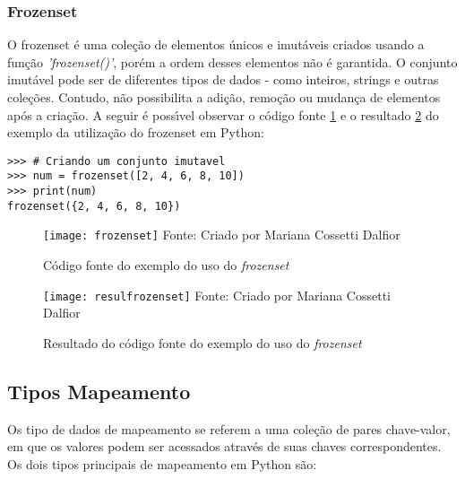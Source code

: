 \subsubsection{Frozenset}
O frozenset \'{e} uma cole\c{c}\~{a}o de elementos \'{u}nicos e imut\'{a}veis criados usando a fun\c{c}\~{a}o \textsl{'frozenset()'}, por\'{e}m a ordem desses elementos n\~{a}o \'{e} garantida. O conjunto imut\'{a}vel pode ser de diferentes tipos de dados - como inteiros, strings e outras cole\c{c}\~{o}es. Contudo, n\~{a}o possibilita a adi\c{c}\~{a}o, remo\c{c}\~{a}o ou mudan\c{c}a de elementos ap\'{o}s a cria\c{c}\~{a}o. A seguir \'{e} poss\'{\i}vel observar o c\'{o}digo fonte \ref{fontefrozenset} e o resultado \ref{resulfrozenset} do exemplo da utiliza\c{c}\~{a}o do frozenset em Python: \newline

\begin{lstlisting}
>>> # Criando um conjunto imutavel
>>> num = frozenset([2, 4, 6, 8, 10])
>>> print(num)
frozenset({2, 4, 6, 8, 10})
\end{lstlisting}	

\begin{figure}[H]
	\begin{center}
		\caption{C\'{o}digo fonte do exemplo do uso do \textsl{frozenset}} \label{fontefrozenset}
		\texttt{[image: frozenset]} 
		\newline
		Fonte: Criado por Mariana Cossetti Dalfior
	\end{center}
\end{figure}

\begin{figure}[H]
	\begin{center}
		\caption{Resultado do c\'{o}digo fonte do exemplo do uso do \textsl{frozenset}} \label{resulfrozenset}
		\texttt{[image: resulfrozenset]} 
		\newline
		Fonte: Criado por Mariana Cossetti Dalfior
	\end{center}
\end{figure}
			
\subsection{Tipos Mapeamento}
Os tipo de dados de mapeamento se referem a uma cole\c{c}\~{a}o de pares chave-valor, em que os valores podem ser acessados atrav\'{e}s de suas chaves correspondentes. Os dois tipos principais de mapeamento em Python s\~{a}o:
